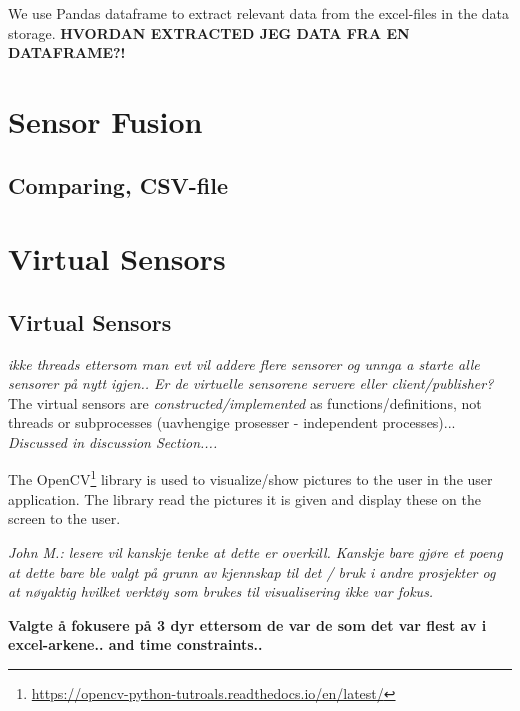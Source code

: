 \documentclass[USenglish]{uit-thesis}
\begin{document}
We use Pandas dataframe to extract relevant data from the excel-files in the data storage. \textbf{HVORDAN EXTRACTED JEG DATA FRA EN DATAFRAME?!}


\section{Sensor Fusion} \label{ssec:imp_senfus}
\subsection{Comparing, CSV-file}

\section{Virtual Sensors} \label{ssec:imp_virsens}
\subsection{Virtual Sensors} \label{vsensor}
\textit{ikke threads ettersom man evt vil addere flere sensorer og unnga a starte alle sensorer på nytt igjen..
Er de virtuelle sensorene servere eller client/publisher?}
The virtual sensors are \textit{constructed/implemented} as functions/definitions, not threads or subprocesses (uavhengige prosesser - independent processes)... \textit{Discussed in discussion Section....}

The OpenCV\footnote{\url{https://opencv-python-tutroals.readthedocs.io/en/latest/}} library is used to visualize/show pictures to the user in the user application. The library read the pictures it is given and display these on the screen to the user.

\textit{John M.: lesere vil kanskje tenke at dette er overkill. Kanskje bare gjøre et poeng at dette bare ble valgt på grunn av kjennskap til det / bruk i andre prosjekter og at nøyaktig hvilket verktøy som brukes til visualisering ikke var fokus.}

\textbf{Valgte å fokusere på 3 dyr ettersom de var de som det var flest av i excel-arkene.. and time constraints..}

\end{document}
